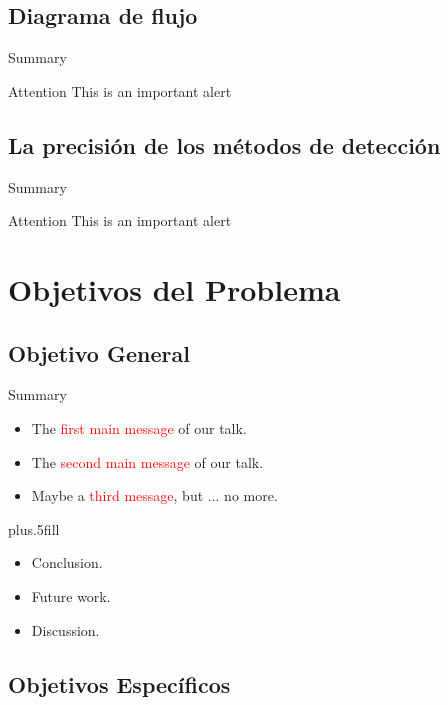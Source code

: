 \documentclass{beamer}
\begin{document}
\subsection{Diagrama de flujo }

\begin{frame}{Summary}
\begin{alertblock}{Attention}
	\textlatin{This is an important alert}
\end{alertblock}
\end{frame}

\subsection{La precisión de los métodos de detección }

\begin{frame}{Summary}
\begin{alertblock}{Attention}
	\textlatin{This is an important alert}
\end{alertblock}
\end{frame}

%
\section{Objetivos del Problema}
\subsection{Objetivo General}

\begin{frame}{Summary}
	\begin{itemize}
		\item The \textcolor{red}{first main message} of our talk.
		\item The \textcolor{red}{second main message} of our talk.
		\item Maybe a \textcolor{red}{third message}, but ... no more.
	\end{itemize}
	\vskip0pt plus.5fill
	\begin{itemize}
		\item Conclusion.
	\end{itemize}
	\begin{itemize}
		\item Future work.
		\item Discussion.
	\end{itemize}
\end{frame}

\subsection{Objetivos Específicos}
\end{document}
